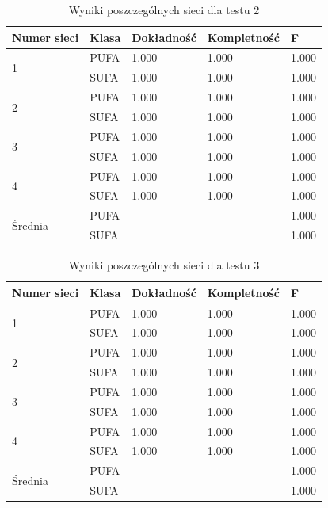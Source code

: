 \documentclass{classrep}
\begin{document}
\begin{table}
\caption{Wyniki poszczególnych sieci dla testu 2}
\label{testTab3}
\begin{tabular}{|p{1.5cm}|p{2.5cm}|p{2.5cm}|p{2.5cm}|p{2.5cm}|}
 \textbf{Numer sieci} & \textbf{Klasa} & \textbf{Dokładność} & \textbf{Kompletność} & \textbf{F} \\ \hline
\multirow{2}{*}{1} 
& PUFA & 1.000 & 1.000 & 1.000 \\
& SUFA & 1.000 & 1.000 & 1.000 \\ \hline
\multirow{2}{*}{2} 
& PUFA & 1.000 & 1.000 & 1.000 \\
& SUFA & 1.000 & 1.000 & 1.000 \\ \hline
\multirow{2}{*}{3} 
& PUFA & 1.000 & 1.000 & 1.000 \\
& SUFA & 1.000 & 1.000 & 1.000\\ \hline
\multirow{2}{*}{4} 
& PUFA & 1.000 & 1.000 & 1.000 \\
& SUFA & 1.000 & 1.000 & 1.000 \\ \hline
\multirow{2}{*}{Średnia}
& PUFA &       &       & 1.000 \\
& SUFA &       &       & 1.000 \\\hline
\end{tabular}
\end{table}

\begin{table}
\caption{Wyniki poszczególnych sieci dla testu 3}
\label{testTab4}
\begin{tabular}{|p{1.5cm}|p{2.5cm}|p{2.5cm}|p{2.5cm}|p{2.5cm}|}
 \textbf{Numer sieci} & \textbf{Klasa} & \textbf{Dokładność} & \textbf{Kompletność} & \textbf{F} \\ \hline
\multirow{2}{*}{1} 
& PUFA & 1.000 & 1.000 & 1.000 \\
& SUFA & 1.000 & 1.000 & 1.000 \\ \hline
\multirow{2}{*}{2} 
& PUFA & 1.000 & 1.000 & 1.000 \\
& SUFA & 1.000 & 1.000 & 1.000 \\ \hline
\multirow{2}{*}{3} 
& PUFA & 1.000 & 1.000 & 1.000 \\
& SUFA & 1.000 & 1.000 & 1.000\\ \hline
\multirow{2}{*}{4} 
& PUFA & 1.000 & 1.000 & 1.000 \\
& SUFA & 1.000 & 1.000 & 1.000 \\ \hline
\multirow{2}{*}{Średnia}
& PUFA &       &       & 1.000 \\
& SUFA &       &       & 1.000 \\\hline
\end{tabular}
\end{table}
\end{document}
